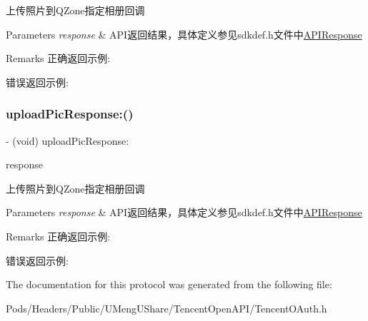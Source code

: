 上传照片到\+Q\+Zone指定相册回调 
\begin{DoxyParams}{Parameters}
{\em response} & A\+P\+I返回结果，具体定义参见sdkdef.\+h文件中\mbox{\hyperlink{interface_a_p_i_response}{A\+P\+I\+Response}} \\
\hline
\end{DoxyParams}
\begin{DoxyRemark}{Remarks}
正确返回示例\+: 
\begin{DoxyCodeInclude}
\end{DoxyCodeInclude}
 错误返回示例\+: 
\begin{DoxyCodeInclude}
\end{DoxyCodeInclude}

\end{DoxyRemark}
\mbox{\label{protocol_tencent_session_delegate-p_ae464b20ef11dd5fbed06862bcbe2f7d2}} 
\subsubsection{\texorpdfstring{upload\+Pic\+Response\+:()}{uploadPicResponse:()}\hspace{0.1cm}{\footnotesize\ttfamily [2/2]}}
{\footnotesize\ttfamily -\/ (void) upload\+Pic\+Response\+: \begin{DoxyParamCaption}\item[{(\mbox{\hyperlink{interface_a_p_i_response}{A\+P\+I\+Response}} $\ast$)}]{response }\end{DoxyParamCaption}\hspace{0.3cm}{\ttfamily [optional]}}

上传照片到\+Q\+Zone指定相册回调 
\begin{DoxyParams}{Parameters}
{\em response} & A\+P\+I返回结果，具体定义参见sdkdef.\+h文件中\mbox{\hyperlink{interface_a_p_i_response}{A\+P\+I\+Response}} \\
\hline
\end{DoxyParams}
\begin{DoxyRemark}{Remarks}
正确返回示例\+: 
\begin{DoxyCodeInclude}
\end{DoxyCodeInclude}
 错误返回示例\+: 
\begin{DoxyCodeInclude}
\end{DoxyCodeInclude}

\end{DoxyRemark}


The documentation for this protocol was generated from the following file\+:\begin{DoxyCompactItemize}
\item 
Pods/\+Headers/\+Public/\+U\+Meng\+U\+Share/\+Tencent\+Open\+A\+P\+I/Tencent\+O\+Auth.\+h\end{DoxyCompactItemize}
